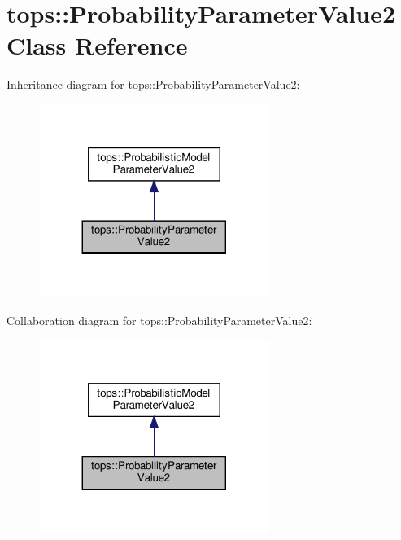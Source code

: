 \hypertarget{classtops_1_1ProbabilityParameterValue2}{}\section{tops\+:\+:Probability\+Parameter\+Value2 Class Reference}
\label{classtops_1_1ProbabilityParameterValue2}


Inheritance diagram for tops\+:\+:Probability\+Parameter\+Value2\+:
\nopagebreak
\begin{figure}[H]
\begin{center}
\leavevmode
\includegraphics[width=212pt]{classtops_1_1ProbabilityParameterValue2__inherit__graph}
\end{center}
\end{figure}


Collaboration diagram for tops\+:\+:Probability\+Parameter\+Value2\+:
\nopagebreak
\begin{figure}[H]
\begin{center}
\leavevmode
\includegraphics[width=212pt]{classtops_1_1ProbabilityParameterValue2__coll__graph}
\end{center}
\end{figure}

